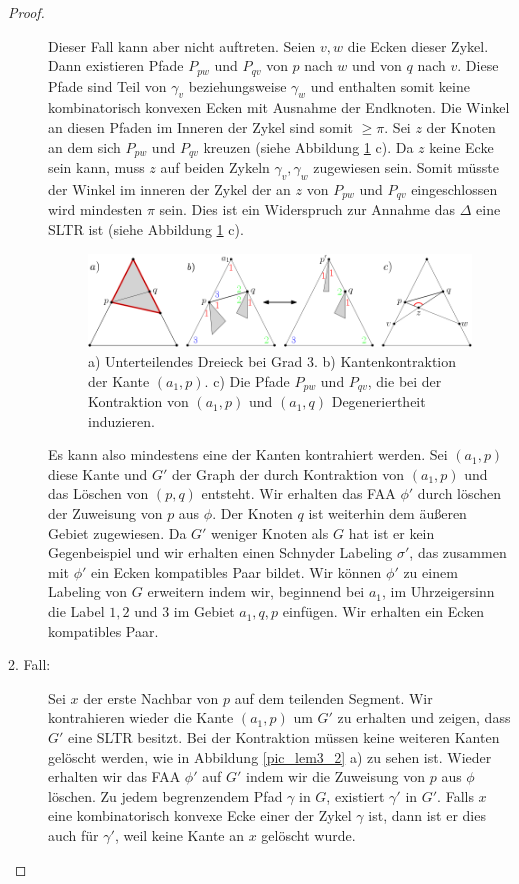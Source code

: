 \begin{proof}
\begin{description}
Dieser Fall kann aber nicht auftreten. Seien $v,w$ die Ecken dieser Zykel. Dann existieren Pfade $P_{pw}$ und $P_{qv}$ von $p$ nach $w$ und von $q$ nach $v$. Diese Pfade sind Teil von $\gamma_v$ beziehungsweise $\gamma_w$ und enthalten somit keine kombinatorisch konvexen Ecken mit Ausnahme der Endknoten. Die Winkel an diesen Pfaden im Inneren der Zykel sind somit $\geq \pi$. Sei $z$ der Knoten an dem sich $P_{pw}$ und $P_{qv}$ kreuzen (siehe Abbildung \ref{pic_lem3_1} c). Da $z$ keine Ecke sein kann, muss $z$ auf beiden Zykeln $\gamma_v,\gamma_w$  zugewiesen sein. Somit müsste der Winkel im inneren der Zykel der an $z$ von $P_{pw}$ und $P_{qv}$ eingeschlossen wird mindesten $\pi$ sein. Dies ist ein Widerspruch zur Annahme das $\Delta$ eine SLTR ist (siehe Abbildung \ref{pic_lem3_1} c).

\begin{figure}[h]
	\centering
	  \includegraphics[width=1\textwidth]{lem3_1.png}
    	\caption{a) Unterteilendes Dreieck bei Grad 3. b) Kantenkontraktion der Kante $(a_1,p)$. c) Die Pfade $P_{pw}$ und $P_{qv}$, die bei der Kontraktion von $(a_1,p)$ und $(a_1,q)$ Degeneriertheit induzieren.}
    	\label{pic_lem3_1}
\end{figure}

Es kann also mindestens eine der Kanten kontrahiert werden. Sei $(a_1,p)$ diese Kante und $G'$ der Graph der durch Kontraktion von $(a_1,p)$ und das Löschen von $(p,q)$ entsteht. Wir erhalten das FAA $\phi'$ durch löschen der Zuweisung von $p$ aus $\phi$. Der Knoten $q$ ist weiterhin dem äußeren Gebiet zugewiesen. Da $G'$ weniger Knoten als $G$ hat ist er kein Gegenbeispiel und wir erhalten einen Schnyder Labeling $\sigma'$, das zusammen mit $\phi'$ ein Ecken kompatibles Paar bildet. Wir können $\phi'$ zu einem Labeling von $G$ erweitern indem wir, beginnend bei $a_1$, im Uhrzeigersinn die Label $1,2$ und $3$ im Gebiet $a_1,q,p$ einfügen. Wir erhalten ein Ecken kompatibles Paar. \\

\item[2. Fall:] Sei $x$ der erste Nachbar von $p$ auf dem teilenden Segment. Wir kontrahieren wieder die Kante $(a_1,p)$ um $G'$ zu erhalten und zeigen, dass $G'$ eine SLTR besitzt. Bei der Kontraktion müssen keine weiteren Kanten gelöscht werden, wie in Abbildung \ref{pic_lem3_2} a) zu sehen ist. Wieder erhalten wir das FAA $\phi'$ auf $G'$ indem wir die Zuweisung von $p$ aus $\phi$ löschen. Zu jedem begrenzendem Pfad $\gamma$ in $G$, existiert $\gamma'$ in $G'$. Falls $x$ eine kombinatorisch konvexe Ecke einer der Zykel $\gamma$ ist, dann ist er dies auch für $\gamma'$, weil keine Kante an $x$ gelöscht wurde.


\end{description}
\end{proof}
